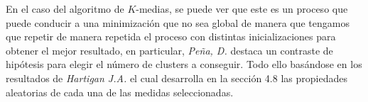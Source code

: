 \noindent En el caso del algoritmo de $K$-medias, se puede ver que este es un proceso que puede conducir a una minimización que no sea global de manera que tengamos que repetir de manera repetida el proceso con distintas inicializaciones para obtener el mejor resultado, en particular, \emph{Peña, D.}\cite{Peña 2002} destaca un contraste de hipótesis para elegir el número de clusters a conseguir. Todo ello basándose en los resultados de \emph{Hartigan J.A.} \cite{Hartigan 1975} el cual desarrolla en la sección 4.8 las propiedades aleatorias de cada una de las medidas seleccionadas. 



%
%

